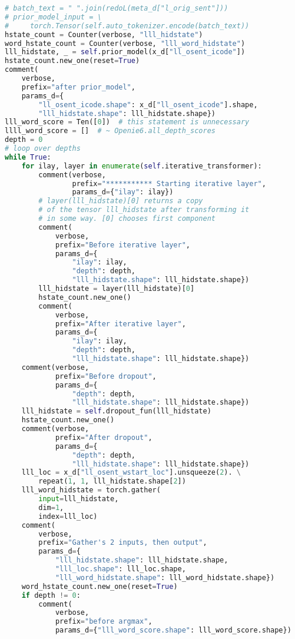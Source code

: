 \documentclass[12pt]{article}
\begin{document}
\begin{lstlisting}[language=Python]
# batch_text = " ".join(redoL(meta_d["l_orig_sent"]))
# prior_model_input = \
#     torch.Tensor(self.auto_tokenizer.encode(batch_text))
hstate_count = Counter(verbose, "lll_hidstate")
word_hstate_count = Counter(verbose, "lll_word_hidstate")
lll_hidstate, _ = self.prior_model(x_d["ll_osent_icode"])
hstate_count.new_one(reset=True)
comment(
    verbose,
    prefix="after prior_model",
    params_d={
        "ll_osent_icode.shape": x_d["ll_osent_icode"].shape,
        "lll_hidstate.shape": lll_hidstate.shape})
lll_word_score = Ten([0])  # this statement is unnecessary
llll_word_score = []  # ~ Openie6.all_depth_scores
depth = 0
# loop over depths
while True:
    for ilay, layer in enumerate(self.iterative_transformer):
        comment(verbose,
                prefix="*********** Starting iterative layer",
                params_d={"ilay": ilay})
        # layer(lll_hidstate)[0] returns a copy
        # of the tensor lll_hidstate after transforming it
        # in some way. [0] chooses first component
        comment(
            verbose,
            prefix="Before iterative layer",
            params_d={
                "ilay": ilay,
                "depth": depth,
                "lll_hidstate.shape": lll_hidstate.shape})
        lll_hidstate = layer(lll_hidstate)[0]
        hstate_count.new_one()
        comment(
            verbose,
            prefix="After iterative layer",
            params_d={
                "ilay": ilay,
                "depth": depth,
                "lll_hidstate.shape": lll_hidstate.shape})
    comment(verbose,
            prefix="Before dropout",
            params_d={
                "depth": depth,
                "lll_hidstate.shape": lll_hidstate.shape})
    lll_hidstate = self.dropout_fun(lll_hidstate)
    hstate_count.new_one()
    comment(verbose,
            prefix="After dropout",
            params_d={
                "depth": depth,
                "lll_hidstate.shape": lll_hidstate.shape})
    lll_loc = x_d["ll_osent_wstart_loc"].unsqueeze(2). \
        repeat(1, 1, lll_hidstate.shape[2])
    lll_word_hidstate = torch.gather(
        input=lll_hidstate,
        dim=1,
        index=lll_loc)
    comment(
        verbose,
        prefix="Gather's 2 inputs, then output",
        params_d={
            "lll_hidstate.shape": lll_hidstate.shape,
            "lll_loc.shape": lll_loc.shape,
            "lll_word_hidstate.shape": lll_word_hidstate.shape})
    word_hstate_count.new_one(reset=True)
    if depth != 0:
        comment(
            verbose,
            prefix="before argmax",
            params_d={"lll_word_score.shape": lll_word_score.shape})

\end{lstlisting}
\end{document}
